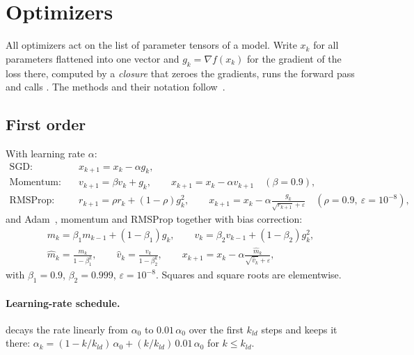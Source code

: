 \section{Optimizers}
\label{sec:optim}

All optimizers act on the list of parameter tensors of a model. Write $x_k$ for all parameters
flattened into one vector and $g_k = \nabla f(x_k)$ for the gradient of the loss there, computed by
a \emph{closure} that zeroes the gradients, runs the forward pass and calls .
The methods and their notation follow~\cite{upc-om, nocedal2006}.

\subsection{First order}
With learning rate $\alpha$:
\begin{align}
  \text{SGD:}\quad & x_{k+1} = x_k - \alpha g_k, \\
  \text{Momentum:}\quad & v_{k+1} = \beta v_k + g_k, \qquad x_{k+1} = x_k - \alpha v_{k+1}
                         \quad(\beta = 0.9), \\
  \text{RMSProp:}\quad & r_{k+1} = \rho r_k + (1-\rho) g_k^2, \qquad
                         x_{k+1} = x_k - \alpha \frac{g_k}{\sqrt{r_{k+1}} + \varepsilon}
                         \quad(\rho = 0.9,\ \varepsilon = 10^{-8}),
\end{align}
and Adam~\cite{kingma2015}, momentum and RMSProp together with bias correction:
\begin{equation}
\begin{gathered}
  m_k = \beta_1 m_{k-1} + (1-\beta_1) g_k, \qquad v_k = \beta_2 v_{k-1} + (1-\beta_2) g_k^2, \\
  \hat m_k = \frac{m_k}{1 - \beta_1^k}, \qquad \hat v_k = \frac{v_k}{1-\beta_2^k}, \qquad
  x_{k+1} = x_k - \alpha \frac{\hat m_k}{\sqrt{\hat v_k} + \varepsilon},
\end{gathered}
\end{equation}
with $\beta_1 = 0.9$, $\beta_2 = 0.999$, $\varepsilon = 10^{-8}$. Squares and square roots are
elementwise.

\paragraph{Learning-rate schedule.}  decays the rate linearly from $\alpha_0$ to
$0.01\,\alpha_0$ over the first $k_{ld}$ steps and keeps it there:
$\alpha_k = (1 - k/k_{ld})\,\alpha_0 + (k/k_{ld})\, 0.01\,\alpha_0$ for $k \le k_{ld}$.

